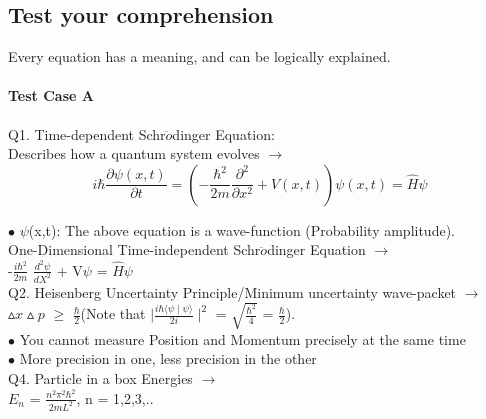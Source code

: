 \documentclass[a4paper, 10pt, onepage]{elegantbook}
\begin{document}
{\subsection{Test your comprehension}

Every equation has a meaning, and can be logically explained.

\paragraph{Test Case A}
\noindent

Q1. Time-dependent Schr$\ddot{o}$dinger Equation: \\
  
Describes how a quantum system evolves $\longrightarrow$
\begin{equation}
i \hbar \frac{\partial \psi(x,t)}{\partial t} = \left( -\frac{\hbar^2}{2m} \frac{ \partial^2}{ \partial x^2} + V(x,t) \right) \psi(x,t) = \hat {H} \psi
\end{equation}


   
$\bullet$ $\psi$(x,t): The above equation is a wave-function (Probability amplitude).  \\

One-Dimensional Time-independent Schr$\ddot{o}$dinger Equation $\longrightarrow$ \\

-$\frac{i \hbar^2}{2m}$ $\frac{d^2 \psi}{d {X}^2}$ + V$\psi$ = $\hat {H} \psi$  \\

Q2. Heisenberg Uncertainty Principle/Minimum uncertainty wave-packet $\longrightarrow$ \\ 

$\vartriangle{x} \vartriangle{p}$ $\geq$ $\frac{\hbar}{2}$(Note that $| \frac{i \hbar \langle \psi \mid\psi \rangle}{2i} \mid^2$ = $ \sqrt{\frac{\hbar^2}{4}}$ = $\frac{\hbar}{2}$). \\

$\bullet$ You cannot measure Position and Momentum precisely at the same time \\
 
$\bullet$ More precision in one, less precision in the other \\

Q4. Particle in a box Energies $\longrightarrow$ \\

$E_n$ = $\frac{n^2 \pi^2 \hbar^2}{{2m}{L^2}}$, n = 1,2,3,..  \\
    
}
\end{document}
